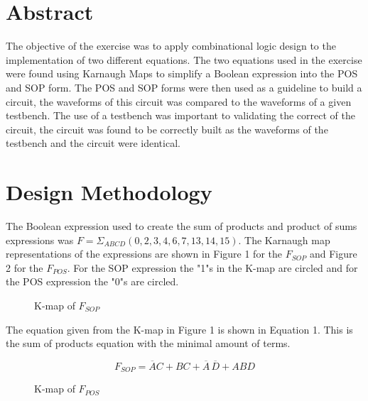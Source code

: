 \documentclass[CMPE]{KGCOEReport}
\begin{document}
\maketitle

\section*{Abstract}
The objective of the exercise was to apply combinational logic design to the implementation of two different equations. The two equations used in the exercise were found using Karnaugh Maps to simplify a Boolean expression into the POS and SOP form. The POS and SOP forms were then used as a guideline to build a circuit, the waveforms of this circuit was compared to the waveforms of a given testbench. The use of a testbench was important to validating the correct of the circuit, the circuit was found to be correctly built as the waveforms of the testbench and the circuit were identical.

\section*{Design Methodology}
The Boolean expression used to create the sum of products and product of sums expressions was $F = \Sigma_{ABCD} (0,2,3,4,6,7,13,14,15)$. The Karnaugh map representations of the expressions are shown in Figure 1 for the $F_{SOP}$ and Figure 2 for the $F_{POS}$. For the SOP expression the "1"s in the K-map are circled and for the POS expression the "0"s are circled.


\begin{figure}[H]
	\centering
	\begin{Karnaugh}[A][B][C][D]
		\end{Karnaugh}
		\caption{K-map of $F_{SOP}$}
		\label{fig:Figure 1}
\end{figure}

The equation given from the K-map in Figure 1 is shown in Equation 1. This is the sum of products equation with the minimal amount of terms.

\begin{equation} F_{SOP} = \overline{A}C + BC + \overline{A}\,\overline{D} + ABD \end{equation}
\begin{figure}[H]
	\centering
	\begin{Karnaugh}[A][B][C][D]
		\end{Karnaugh}
		\caption{K-map of $F_{POS}$}
		\label{fig:Figure 2}
\end{figure}
\end{document}

